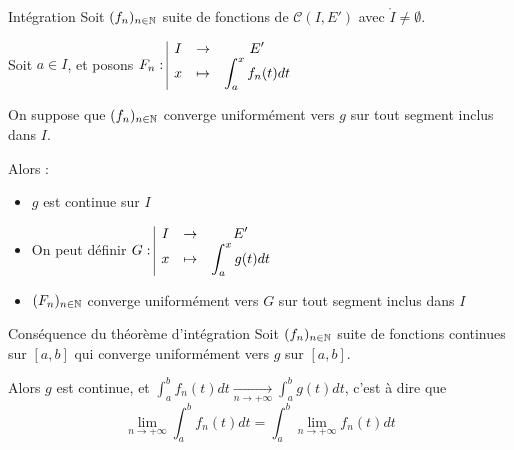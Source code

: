 \begin{theoreme}{Intégration}{}
    Soit $(f_n)_{n \in \mathbb{N}}$ suite de fonctions de $\mathscr C (I, E')$ avec
    $\mathring I \neq \emptyset$.

    Soit $a \in I$, et posons $F_n: \space \begin{array}{|ccc} \displaystyle I & \to & \displaystyle E' \\ \displaystyle x & \mapsto & \displaystyle \int_a^x f_n(t) dt \end{array}$

    On suppose que $(f_n)_{n \in \mathbb{N}}$ converge uniformément vers $g$ 
    sur tout segment inclus dans $I$.

    Alors : 
    \begin{itemize}
        \item $g$ est continue sur $I$
        \item On peut définir $G: \space \begin{array}{|ccc} \displaystyle I & \to & \displaystyle E' \\ \displaystyle x & \mapsto & \displaystyle \int_a^x g(t) dt \end{array}$
        \item $(F_n)_{n \in \mathbb{N}}$ converge uniformément vers $G$ sur tout segment inclus dans $I$
    \end{itemize}
\end{theoreme}

\begin{corollaire}{Conséquence du théorème d'intégration}{}
    Soit $(f_n)_{n \in \mathbb{N}}$ suite de fonctions continues sur 
    $[a, b]$ qui converge uniformément vers $g$ sur $[a, b]$. 
    
    Alors $g$ est continue, et
    $\displaystyle \int_a^b f_n(t) dt \xrightarrow[n\to +\infty]{} \int_a^b g(t) dt$, c'est à dire 
    que $$\lim_{n \to +\infty} \int_a^b f_n(t) dt = \int_a^b \lim_{n \to +\infty} f_n(t) dt$$ 
\end{corollaire}



